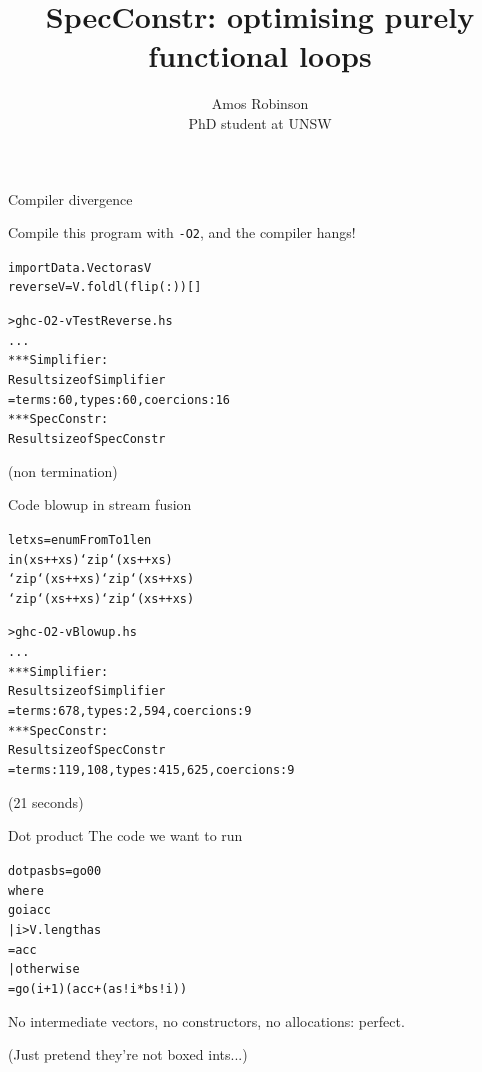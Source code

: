 \documentclass[t]{beamer}
\newcommand{\oomph}[1]{\textcolor[rgb]{0.0,0.5,0.9}{#1}}
\begin{document}
\title{SpecConstr: optimising purely functional loops}
\author{Amos Robinson\\PhD student at UNSW}

\frame{\titlepage}

\begin{frame}[fragile]{Compiler divergence}

 Compile this program with \verb/-O2/, and the compiler hangs!

\begin{alltt}
import Data.Vector as V
reverseV = V.foldl (flip (:)) []

> ghc -O2 -v TestReverse.hs
...
*** Simplifier:
Result size of Simplifier
  = {terms: 60, types: 60, coercions: 16}
*** SpecConstr:
Result size of SpecConstr
\end{alltt}
(non termination)

\end{frame}

\begin{frame}[fragile]{Code blowup in stream fusion}
\begin{alltt}
let xs = enumFromTo 1 len
in       (xs ++ xs) `zip` (xs ++ xs)
   `zip` (xs ++ xs) `zip` (xs ++ xs)
   `zip` (xs ++ xs) `zip` (xs ++ xs)

> ghc -O2 -v Blowup.hs
...
*** Simplifier:
Result size of Simplifier
  = {terms: \oomph{678}, types: 2,594, coercions: 9}
*** SpecConstr:
Result size of SpecConstr
  = {terms: \oomph{119,108}, types: 415,625, coercions: 9}
\end{alltt}
(21 seconds)
\end{frame}


\begin{frame}[fragile]{Dot product}
The code we want to run
\begin{alltt}\Large
dotp as bs = go 0 0
 where
  go i acc
   | i > V.length as
   = acc
   | otherwise
   = go (i + 1) (acc + (as!i * bs!i))
\end{alltt}
No intermediate vectors, no constructors, no allocations: perfect.

(Just pretend they're not boxed ints...)
\end{frame}
\end{document}
